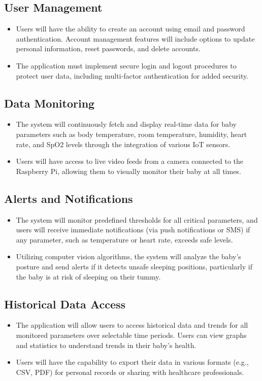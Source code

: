 \documentclass[12pt,a4paper]{report}
\begin{document}
\subsection{User Management}
\begin{itemize}
  \item Users will have the ability to create an account using email and password authentication. Account management features will include options to update personal information, reset passwords, and delete accounts.
  \item The application must implement secure login and logout procedures to protect user data, including multi-factor authentication for added security.
\end{itemize}

\subsection{Data Monitoring}
\begin{itemize}
  \item The system will continuously fetch and display real-time data for baby parameters such as body temperature, room temperature, humidity, heart rate, and SpO2 levels through the integration of various IoT sensors.
  \item Users will have access to live video feeds from a camera connected to the Raspberry Pi, allowing them to visually monitor their baby at all times.
\end{itemize}

\subsection{Alerts and Notifications}
\begin{itemize}
  \item The system will monitor predefined thresholds for all critical parameters, and users will receive immediate notifications (via push notifications or SMS) if any parameter, such as temperature or heart rate, exceeds safe levels.
  \item Utilizing computer vision algorithms, the system will analyze the baby’s posture and send alerts if it detects unsafe sleeping positions, particularly if the baby is at risk of sleeping on their tummy.
\end{itemize}

\subsection{Historical Data Access}
\begin{itemize}
  \item The application will allow users to access historical data and trends for all monitored parameters over selectable time periods. Users can view graphs and statistics to understand trends in their baby's health.
  \item Users will have the capability to export their data in various formats (e.g., CSV, PDF) for personal records or sharing with healthcare professionals.
\end{itemize}
\end{document}
